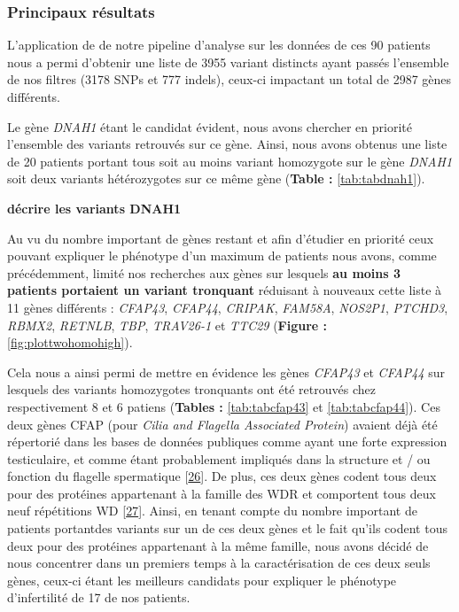 \documentclass[12pt,twoside]{reedthesis}
\theoremstyle{definition}
\theoremstyle{definition}
\theoremstyle{remark}
\begin{document}
  
  
  \newpage
  
  \subsubsection{Principaux résultats}\label{principaux-resultats-4}
  
  L'application de de notre pipeline d'analyse sur les données de ces 90
  patients nous a permi d'obtenir une liste de 3955 variant distincts
  ayant passés l'ensemble de nos filtres (3178 SNPs et 777 indels),
  ceux-ci impactant un total de 2987 gènes différents.
  
  Le gène \emph{DNAH1} étant le candidat évident, nous avons chercher en
  priorité l'ensemble des variants retrouvés sur ce gène. Ainsi, nous
  avons obtenus une liste de 20 patients portant tous soit au moins
  variant homozygote sur le gène \emph{DNAH1} soit deux variants
  hétérozygotes sur ce même gène (\textbf{Table : }\ref{tab:tabdnah1}).
  
  \textbf{décrire les variants DNAH1}
  
  Au vu du nombre important de gènes restant et afin d'étudier en priorité
  ceux pouvant expliquer le phénotype d'un maximum de patients nous avons,
  comme précédemment, limité nos recherches aux gènes sur lesquels
  \textbf{au moins 3 patients portaient un variant tronquant} réduisant à
  nouveaux cette liste à 11 gènes différents : \emph{CFAP43},
  \emph{CFAP44}, \emph{CRIPAK}, \emph{FAM58A}, \emph{NOS2P1},
  \emph{PTCHD3}, \emph{RBMX2}, \emph{RETNLB}, \emph{TBP}, \emph{TRAV26-1}
  et \emph{TTC29} (\textbf{Figure : }\ref{fig:plottwohomohigh}).
  
  Cela nous a ainsi permi de mettre en évidence les gènes \emph{CFAP43} et
  \emph{CFAP44} sur lesquels des variants homozygotes tronquants ont été
  retrouvés chez respectivement 8 et 6 patiens (\textbf{Tables :
  }\ref{tab:tabcfap43} et \ref{tab:tabcfap44}). Ces deux gènes CFAP (pour
  \emph{Cilia and Flagella Associated Protein}) avaient déjà été
  répertorié dans les bases de données publiques comme ayant une forte
  expression testiculaire, et comme étant probablement impliqués dans la
  structure et / ou fonction du flagelle spermatique
  {[}\protect\hyperlink{ref-Ivliev2012}{26}{]}. De plus, ces deux gènes
  codent tous deux pour des protéines appartenant à la famille des WDR et
  comportent tous deux neuf répétitions WD
  {[}\protect\hyperlink{ref-Smith2008}{27}{]}. Ainsi, en tenant compte du
  nombre important de patients portantdes variants sur un de ces deux
  gènes et le fait qu'ils codent tous deux pour des protéines appartenant
  à la même famille, nous avons décidé de nous concentrer dans un premiers
  temps à la caractérisation de ces deux seuls gènes, ceux-ci étant les
  meilleurs candidats pour expliquer le phénotype d'infertilité de 17 de
  nos patients.
  
\end{document}
